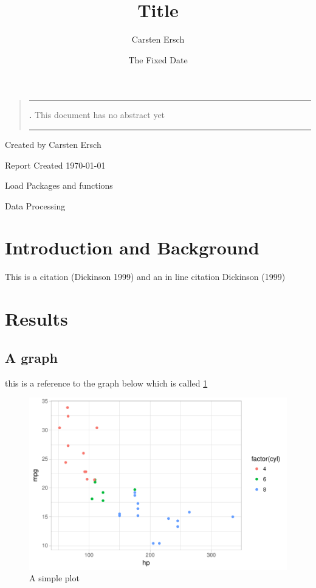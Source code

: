 \documentclass[]{article}
\title{Title}
\author{Carsten Ersch}
\date{The Fixed Date}
\renewenvironment{abstract}
{\begin{quote}
\noindent \rule{\linewidth}{.5pt}\par{\bfseries \abstractname.}}
{\medskip\noindent \rule{\linewidth}{.5pt}
\end{quote}
}
\begin{document}
\begin{titlepage}

\centering


\maketitle
\thispagestyle{empty}


\begin{abstract}
This document has no abstract yet

\end{abstract}

\vfill

  {\footnotesize  Created by Carsten Ersch}
  
	{\footnotesize  Report Created \today\par}
\end{titlepage}

{
\setcounter{tocdepth}{2}
\tableofcontents
}

\pagebreak

Load Packages and functions

Data Processing

\section{Introduction and Background}\label{introduction-and-background}

This is a citation (Dickinson 1999) and an in line citation Dickinson
(1999)

\section{Results}\label{results}

\subsection{A graph}\label{a-graph}

this is a reference to the graph below which is called \ref{fig:fig1}

\begin{figure}[htbp]
\centering
\includegraphics{RMarkdownTemplate_files/figure-latex/fig1-1.pdf}
\caption{\label{fig:fig1} A simple plot}
\end{figure}
\end{document}
